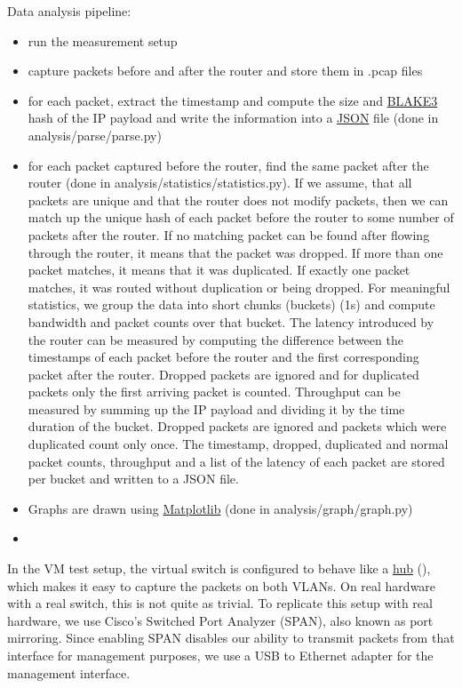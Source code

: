Data analysis pipeline:
\begin{itemize}
  \item run the measurement setup
  \item capture packets before and after the router and store them in .pcap files
  \item for each packet, extract the timestamp and compute the size and \href{https://en.wikipedia.org/wiki/BLAKE_(hash_function)#BLAKE3}{BLAKE3} hash of the IP payload and write the information into a \href{https://en.wikipedia.org/wiki/JSON}{JSON} file (done in analysis/parse/parse.py)
  \item for each packet captured before the router, find the same packet after the router (done in analysis/statistics/statistics.py). If we assume, that all packets are unique and that the router does not modify packets, then we can match up the unique hash of each packet before the router to some number of packets after the router. If no matching packet can be found after flowing through the router, it means that the packet was dropped. If more than one packet matches, it means that it was duplicated. If exactly one packet matches, it was routed without duplication or being dropped. For meaningful statistics, we group the data into short chunks (buckets) (1s) and compute bandwidth and packet counts over that bucket. The latency introduced by the router can be measured by computing the difference between the timestamps of each packet before the router and the first corresponding packet after the router. Dropped packets are ignored and for duplicated packets only the first arriving packet is counted. Throughput can be measured by summing up the IP payload  and dividing it by the time duration of the bucket. Dropped packets are ignored and packets which were duplicated count only once. The timestamp, dropped, duplicated and normal packet counts, throughput and a list of the latency of each packet are stored per bucket and written to a JSON file.
  \item Graphs are drawn using \href{https://matplotlib.org/}{Matplotlib} (done in analysis/graph/graph.py)
  \item {}
\end{itemize}


In the VM test setup, the virtual switch is configured to behave like a \href{https://en.wikipedia.org/wiki/Ethernet_hub}{hub} (\href{https://github.com/NixOS/nixpkgs/blob/0634959ae9c75ac8cab28dfcc9a0f045cf30dfc6/nixos/lib/test-driver/test_driver/vlan.py#L43}{}), which makes it easy to capture the packets on both VLANs. On real hardware with a real switch, this is not quite as trivial. To replicate this setup with real hardware, we use Cisco's Switched Port Analyzer (SPAN), also known as port mirroring. Since enabling SPAN disables our ability to transmit packets from that interface for management purposes, we use a USB to Ethernet adapter for the management interface.
